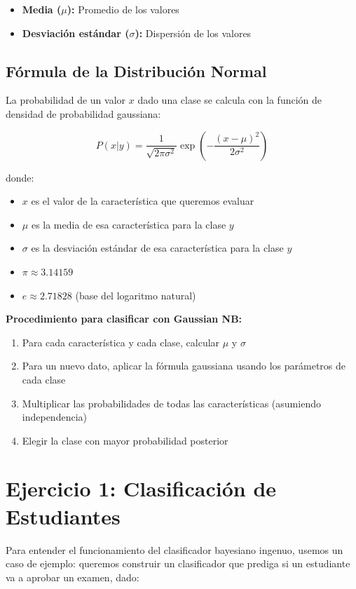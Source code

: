 \documentclass[12pt]{article}
\begin{document}
\begin{itemize}
    \item \textbf{Media ($\mu$):} Promedio de los valores
    \item \textbf{Desviación estándar ($\sigma$):} Dispersión de los valores
\end{itemize}

\subsection{Fórmula de la Distribución Normal}
La probabilidad de un valor $x$ dado una clase se calcula con la función de densidad de probabilidad gaussiana:

\[
P(x|y) = \frac{1}{\sqrt{2\pi\sigma^2}} \exp\left(-\frac{(x-\mu)^2}{2\sigma^2}\right)
\]

donde:
\begin{itemize}
    \item $x$ es el valor de la característica que queremos evaluar
    \item $\mu$ es la media de esa característica para la clase $y$
    \item $\sigma$ es la desviación estándar de esa característica para la clase $y$
    \item $\pi \approx 3.14159$
    \item $e \approx 2.71828$ (base del logaritmo natural)
\end{itemize}

\textbf{Procedimiento para clasificar con Gaussian NB:}
\begin{enumerate}
    \item Para cada característica y cada clase, calcular $\mu$ y $\sigma$
    \item Para un nuevo dato, aplicar la fórmula gaussiana usando los parámetros de cada clase
    \item Multiplicar las probabilidades de todas las características (asumiendo independencia)
    \item Elegir la clase con mayor probabilidad posterior
\end{enumerate}

\section{Ejercicio 1: Clasificación de Estudiantes}
Para entender el funcionamiento del clasificador bayesiano ingenuo, usemos un caso de ejemplo: queremos construir un clasificador que prediga si un estudiante va a aprobar un examen, dado:
\end{document}

